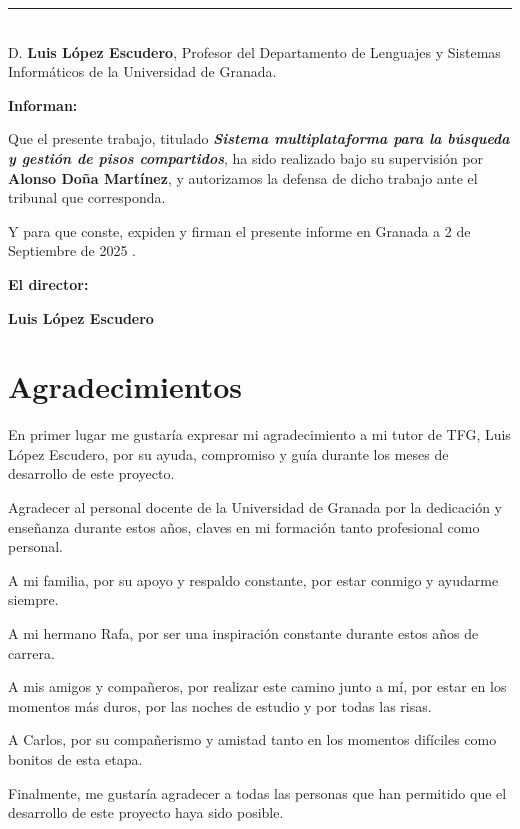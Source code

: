 \noindent\rule[-1ex]{\textwidth}{2pt}\\[4.5ex]

D. \textbf{Luis López Escudero}, Profesor del Departamento de Lenguajes y Sistemas Informáticos  de la Universidad de Granada.


\vspace{0.5cm}

\textbf{Informan:}

\vspace{0.5cm}

Que el presente trabajo, titulado \textit{\textbf{Sistema multiplataforma para la búsqueda y gestión de pisos compartidos}},
ha sido realizado bajo su supervisión por \textbf{Alonso Doña Martínez}, y autorizamos la defensa de dicho trabajo ante el tribunal
que corresponda.

\vspace{0.5cm}

Y para que conste, expiden y firman el presente informe en Granada a 2 de Septiembre de 2025 .

\vspace{1cm}

\textbf{El director:}

\vspace{5cm}

\noindent \textbf{Luis López Escudero}

\chapter*{Agradecimientos}
\thispagestyle{empty}

En primer lugar me gustaría expresar mi agradecimiento a mi tutor de TFG, Luis López Escudero, por su ayuda, compromiso y guía durante los meses de desarrollo de este proyecto.

Agradecer al personal docente de la Universidad de Granada por la dedicación y enseñanza durante estos años, claves en mi formación tanto profesional como personal.

A mi familia, por su apoyo y respaldo constante, por estar conmigo y ayudarme siempre.

A mi hermano Rafa, por ser una inspiración constante durante estos años de carrera.

A mis amigos y compañeros, por realizar este camino junto a mí, por estar en los momentos más duros, por las noches de estudio y por todas las risas.

A Carlos, por su compañerismo y amistad tanto en los momentos difíciles como bonitos de esta etapa. 

Finalmente, me gustaría agradecer a todas las personas que han permitido que el desarrollo de este proyecto haya sido posible.
\cleardoublepage